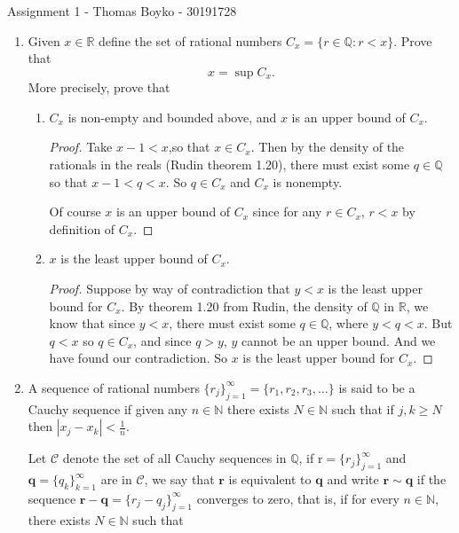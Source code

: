 \documentclass{article}
\begin{document}
    \huge Assignment 1 - Thomas Boyko - 30191728
    \normalsize
\begin{enumerate} 
    \item Given $x\in\mathbb{R}$ define the set of rational numbers $C_x=\{r\in\mathbb{Q}:r<x\}.$ Prove that
$$x=\sup C_x.$$
More precisely, prove that
\begin{enumerate}[label= (\alph*)] 
    \item $C_{x}$ is non-empty and bounded above, and $x$ is an upper bound of $C_{x}.$

        \begin{proof} 

            Take $x-1<x$,so that $x\in {C}_x$. Then by the density of the rationals in the reals (Rudin theorem 1.20), there must exist some $q\in \mathbb{Q}$ so that
            $x-1<q<x$. So $q\in C_{x}$ and $C_{x}$ is nonempty.

            Of course $x$ is an upper bound of ${C}_x$ since for any $r\in C_x$, $r<x$ by definition of $C_{x}$.

        \end{proof}

    \item $x$ is the least upper bound of $C_{x}$.

         \begin{proof} 
            Suppose by way of contradiction that $y<x$ is the least upper bound for $C_x$. By theorem 1.20 from Rudin, the density of $\mathbb{Q}$ in $\mathbb{R}$,
            we know that since $y<x$, there must exist some $q\in \mathbb{Q}$, where $y<q<x$. But $q<x$ so $q\in C_x$, and since $q>y$, $y$ cannot be
            an upper bound. And we have found our contradiction. So $x$ is the least upper bound for $C_x$.
        \end{proof}

\end{enumerate}

\item A sequence of rational numbers $\{r_{j}\}_{j=1}^{\infty}=\{r_{1},r_{2},r_{3},\ldots\}$ is said to be a Cauchy sequence
if given any $n\in \mathbb{N}$ there exists $N\in \mathbb{N}$ such that if $j, k\geq N$ then $| x_j- x_k| < \frac 1n.$

Let $\mathcal{C}$ denote the set of all Cauchy sequences in $\mathbb{Q}$, if r$= \{ r_j\} _{j= 1}^{\infty }$ and $\mathbf{q} = \{ q_k\} _{k= 1}^{\infty }$ are in
$\mathcal{C}$, we say that $\mathbf{r}$ is equivalent to $\mathbf{q}$ and write $\mathbf{r}\sim\mathbf{q}$ if the sequence $\mathbf{r}-\mathbf{q}=\{r_j-q_j\}_{j=1}^{\infty}$
converges to zero, that is, if for every $n\in\mathbb{N}$, there exists $N\in\mathbb{N}$ such that


\end{enumerate}
\end{document}
